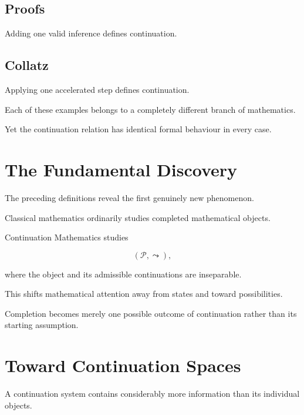 \documentclass[13pt,openany]{book}
\theoremstyle{plain}
\theoremstyle{definition}
\begin{document}
\subsection*{Proofs}

Adding one valid inference defines continuation.

\vspace{0.5em}

\subsection*{Collatz}

Applying one accelerated step defines continuation.

Each of these examples belongs to a completely different branch of
mathematics.

Yet the continuation relation has identical formal behaviour in every
case.

\section{The Fundamental Discovery}

The preceding definitions reveal the first genuinely new phenomenon.

Classical mathematics ordinarily studies completed mathematical objects.

Continuation Mathematics studies

\[
(\mathcal P,\leadsto),
\]

where the object and its admissible continuations are inseparable.

This shifts mathematical attention away from states and toward
possibilities.

Completion becomes merely one possible outcome of continuation rather than
its starting assumption.

\section{Toward Continuation Spaces}

A continuation system contains considerably more information than its
individual objects.
\end{document}
